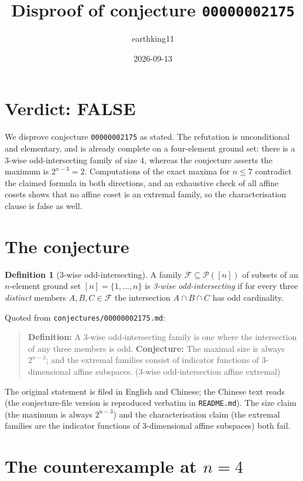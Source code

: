 \documentclass[11pt]{article}
\title{Disproof of conjecture \texttt{00000002175}}
\author{earthking11}
\date{2026-09-13}
\theoremstyle{definition}
\newtheorem{definition}[theorem]{Definition}
\theoremstyle{remark}
\newcommand{\Pn}{\mathcal{P}}
\begin{document}
\maketitle

\section*{Verdict: FALSE}

We disprove conjecture \texttt{00000002175} as stated. The refutation is
unconditional and elementary, and is already complete on a four-element ground
set: there is a 3-wise odd-intersecting family of size $4$, whereas the
conjecture asserts the maximum is $2^{n-3} = 2$. Computations of the exact
maxima for $n \le 7$ contradict the claimed formula in both directions, and an
exhaustive check of all affine cosets shows that no affine coset is an extremal
family, so the characterisation clause is false as well.

\section{The conjecture}

\begin{definition}[3-wise odd-intersecting]
A family $\mathcal{F} \subseteq \Pn([n])$ of subsets of an $n$-element ground
set $[n] = \{1, \dots, n\}$ is \emph{3-wise odd-intersecting} if for every three
\emph{distinct} members $A, B, C \in \mathcal{F}$ the intersection $A \cap B
\cap C$ has odd cardinality.
\end{definition}

Quoted from \texttt{conjectures/00000002175.md}:

\begin{quote}
\textbf{Definition:} A 3-wise odd-intersecting family is one where the
intersection of any three members is odd. \textbf{Conjecture:} The maximal size
is always $2^{n-3}$; and the extremal families consist of indicator functions of
3-dimensional affine subspaces. (3-wise odd-intersection affine extremal)
\end{quote}

The original statement is filed in English and Chinese; the Chinese text reads
(the conjecture-file version is reproduced verbatim in \texttt{README.md}).
The size claim (the maximum is always $2^{n-3}$) and the characterisation claim
(the extremal families are the indicator functions of 3-dimensional affine
subspaces) both fail.

\section{The counterexample at $n = 4$}
\end{document}
